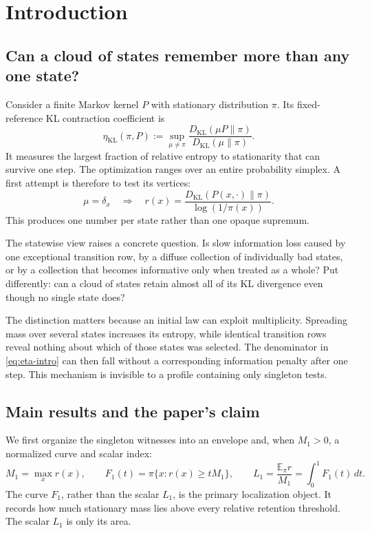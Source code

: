 \documentclass[11pt]{article}
\newcommand{\KL}{D_{\mathrm{KL}}}
\newcommand{\etaStat}{\eta_{\mathrm{KL}}(\pi,P)}
\newcommand{\Mone}{M_1}
\newcommand{\Lone}{L_1}
\newcommand{\E}{\mathbb{E}}
\begin{document}
\section{Introduction}
\label{sec:intro}

\subsection{Can a cloud of states remember more than any one state?}

Consider a finite Markov kernel \(P\) with stationary distribution \(\pi\).
Its fixed-reference KL contraction coefficient is
\begin{equation}
  \etaStat
  :=
  \sup_{\mu\ne\pi}
  \frac{\KL(\mu P\|\pi)}{\KL(\mu\|\pi)}.
  \label{eq:eta-intro}
\end{equation}
It measures the largest fraction of relative entropy to stationarity that
can survive one step.  The optimization ranges over an entire probability
simplex.  A first attempt is therefore to test its vertices:
\[
  \mu=\delta_x
  \quad\Longrightarrow\quad
  r(x)
  =
  \frac{\KL(P(x,\cdot)\|\pi)}{\log(1/\pi(x))}.
\]
This produces one number per state rather than one opaque supremum.

The statewise view raises a concrete question.  Is slow information loss
caused by one exceptional transition row, by a diffuse collection of
individually bad states, or by a collection that becomes informative only
when treated as a whole?  Put differently: can a cloud of states retain
almost all of its KL divergence even though no single state does?

The distinction matters because an initial law can exploit multiplicity.
Spreading mass over several states increases its entropy, while identical
transition rows reveal nothing about which of those states was selected.
The denominator in \eqref{eq:eta-intro} can then fall without a corresponding
information penalty after one step.  This mechanism is invisible to a
profile containing only singleton tests.

\subsection{Main results and the paper's claim}

We first organize the singleton witnesses into an envelope and, when
\(\Mone>0\), a normalized curve and scalar index:
\[
  \Mone=\max_x r(x),\qquad
  F_1(t)=\pi\{x:r(x)\ge t\Mone\},\qquad
  \Lone=\frac{\E_\pi r}{\Mone}
       =\int_0^1 F_1(t)\,dt .
\]
The curve \(F_1\), rather than the scalar \(\Lone\), is the primary
localization object.  It records how much stationary mass lies above every
relative retention threshold.  The scalar \(\Lone\) is only its area.
\end{document}
